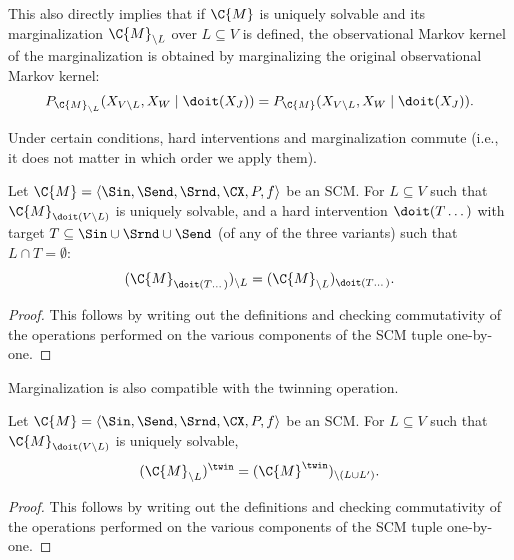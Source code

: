 \begin{Rem}
This also directly implies that if $\C{M}$ is uniquely solvable and its marginalization $\C{M}_{\setminus L}$ over $L \subseteq V$ is defined, the observational Markov kernel of the marginalization is obtained by marginalizing the original observational Markov kernel:
$$P_{\C{M}_{\setminus L}}(X_{V\setminus L},X_W \mid \doit(X_J)) = P_{\C{M}}(X_{V\setminus L},X_W \mid \doit(X_J)).$$
\end{Rem}

Under certain conditions, hard interventions and marginalization commute (i.e., it does not matter in which
order we apply them).
\begin{Prp}\label{prp:interventions_marginalizations_commute}
Let $\C{M} = \langle \Sin, \Send, \Srnd, \CX, P, f \rangle$ be an SCM.
    For $L \subseteq V$ such that $\C{M}_{\doit(V\setminus L)}$ is uniquely solvable,
    and a hard intervention $\doit(T\dots)$ with target $T \subseteq \Sin \cup \Srnd \cup \Send$ (of any of the three variants) such that $L \cap T = \emptyset$:
    $$(\C{M}_{\doit(T\dots)})_{\setminus L} = (\C{M}_{\setminus L})_{\doit(T\dots)}.$$
\end{Prp}
\begin{proof}
  This follows by writing out the definitions and checking commutativity of
  the operations performed on the various components of the SCM tuple one-by-one. 
\end{proof}
Marginalization is also compatible with the twinning operation.
\begin{Prp}\label{prp:twinning_marginalization_commute}
Let $\C{M} = \langle \Sin, \Send, \Srnd, \CX, P, f \rangle$ be an SCM.
For $L \subseteq V$ such that $\C{M}_{\doit(V\setminus L)}$ is uniquely solvable,
$$(\C{M}_{\setminus L})^\twin = (\C{M}^\twin)_{\setminus (L\cup L')}.$$
\end{Prp}
\begin{proof}
  This follows by writing out the definitions and checking commutativity of
  the operations performed on the various components of the SCM tuple one-by-one.
\end{proof}

